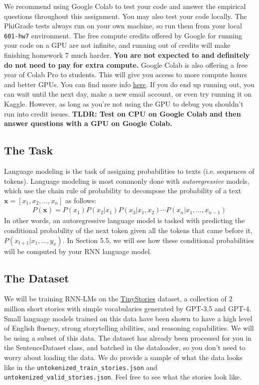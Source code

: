 \documentclass[11pt,addpoints,answers]{exam}
\newcommand{\xv}{\mathbf{x}}
\begin{document}
We recommend using Google Colab to test your code and answer the empirical questions throughout this assignment. You may also test your code locally. The PhiGrade tests always run on your own machine, so run them from your local \texttt{601-hw7} environment. The free compute credits offered by Google for running your code on a GPU are not infinite, and running out of credits will make finishing homework 7 much harder. \textbf{You are not expected to and definitely do not need to pay for extra compute.} Google Colab is also offering a free year of Colab Pro to students. This will give you access to more compute hours and better GPUs. You can find more info \href{https://colab.research.google.com/signup}{here}. If you do end up running out, you can wait until the next day, make a new email account, or even try running it on Kaggle. However, as long as you're not using the GPU to debug you shouldn't run into credit issues. \textbf{TLDR: Test on CPU on Google Colab and then answer questions with a GPU on Google Colab.}

\subsection{The Task}\label{task}

Language modeling is the task of assigning probabilities to texts (i.e. sequences of tokens). Language modeling is most commonly done with \textit{autoregressive} models, which use the chain rule of probability to decompose the probability of a text $\xv = [ x_1, x_2, \ldots, x_n ]$ as follows:
\begin{align*}
    P(\xv) = P(x_1) P(x_2 | x_1) P(x_3 | x_1, x_2) \cdots P(x_n | x_1,\ldots,x_{n-1})
\end{align*}
In other words, an autoregressive language model is tasked with predicting the conditional probability of the next token given all the tokens that came before it, $P(x_{t+1} | x_1,\ldots,y_{x})$. In Section 5.5, we will see how these conditional probabilities will be computed by your RNN language model.


\subsection{The Dataset}\label{dataset}
We will be training RNN-LMs on the \href{https://huggingface.co/datasets/roneneldan/TinyStories}{TinyStories} dataset, a collection of 2 million short stories with simple vocabularies generated by GPT-3.5 and GPT-4. Small language models trained on this data have been shown to have a high level of English fluency, strong storytelling abilities, and reasoning capabilities. We will be using a subset of this data. The dataset has already been processed for you in the SentenceDataset class, and batched in the dataloader, so you don't need to worry about loading the data. We do provide a sample of what the data looks like in the \texttt{untokenized\_train\_stories.json} and \texttt{untokenized\_valid\_stories.json}. Feel free to see what the stories look like.
\end{document}
